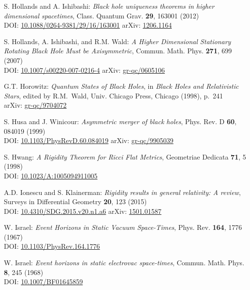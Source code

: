 \begin{thebibliography}{123}
S. Hollands and A. Ishibashi:
{\em Black hole uniqueness theorems in higher dimensional spacetimes},
Class. Quantum Grav. {\bf 29}, 163001 (2012)\\
DOI: \href{https://doi.org/10.1088/0264-9381/29/16/163001}{10.1088/0264-9381/29/16/163001}\hfill
arXiv: \href{https://arxiv.org/abs/1206.1164}{1206.1164}

S. Hollands, A. Ishibashi, and R.M. Wald:
{\em A Higher Dimensional Stationary Rotating Black Hole Must be Axisymmetric},
Commun. Math. Phys. {\bf 271}, 699 (2007)\\
DOI: \href{https://doi.org/10.1007/s00220-007-0216-4}{10.1007/s00220-007-0216-4}\hfill
arXiv: \href{https://arxiv.org/abs/gr-qc/0605106}{gr-qc/0605106}

G.T. Horowitz:
{\em Quantum States of Black Holes},
in {\em Black Holes and Relativistic Stars}, edited by R.M.~Wald,
Univ. Chicago Press, Chicago (1998), p.~241\\
arXiv: \href{https://arxiv.org/abs/gr-qc/9704072}{gr-qc/9704072}

S. Husa and J. Winicour:
{\em Asymmetric merger of black holes},
Phys. Rev. D {\bf 60}, 084019 (1999)\\
DOI: \href{https://doi.org/10.1103/PhysRevD.60.084019}{10.1103/PhysRevD.60.084019}\hfill
arXiv: \href{https://arxiv.org/abs/gr-qc/9905039}{gr-qc/9905039}

S. Hwang:
{\em A Rigidity Theorem for Ricci Flat Metrics},
Geometriae Dedicata {\bf 71}, 5 (1998)\\
DOI: \href{https://doi.org/10.1023/A:1005094911005}{10.1023/A:1005094911005}

A.D. Ionescu and S. Klainerman:
{\em Rigidity results in general relativity: A review},
Surveys in Differential Geometry {\bf 20}, 123 (2015)\\
DOI: \href{https://dx.doi.org/10.4310/SDG.2015.v20.n1.a6}{10.4310/SDG.2015.v20.n1.a6}\hfill
arXiv: \href{https://arxiv.org/abs/1501.01587}{1501.01587}

W. Israel: {\em Event Horizons in Static Vacuum Space-Times},
Phys. Rev. {\bf 164}, 1776 (1967)\\
DOI: \href{https://doi.org/10.1103/PhysRev.164.1776}{10.1103/PhysRev.164.1776}

W. Israel: {\em Event horizons in static electrovac space-times},
Commun. Math. Phys. {\bf 8}, 245 (1968)\\
DOI: \href{https://doi.org/10.1007/BF01645859}{10.1007/BF01645859}


\end{thebibliography}
